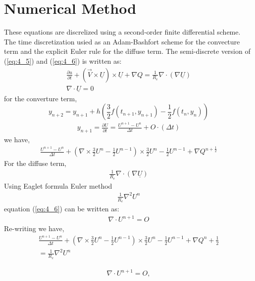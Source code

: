 \documentclass[11pt]{report}
\newcommand{\sps}{\\[0.2cm]}
\newcommand{\refn}[1]{(\ref{#1})}
\newcommand{\refx}[1]{\refn{eq:#1}}
\begin{document}
	\section{Numerical Method}
	These equations are discrelized using a second-order finite differential scheme. The time discretization usied as an Adam-Bashfort scheme for the convecture term and the explicit Euler rule for the diffuse term. The semi-discrete version of \refx{4_5} and \refx{4_6} is written as:
	\begin{gather*}
		\frac{\partial u}{\partial t} + (\vec{V}\times\underline{U}) \times \underline{U} + \nabla Q = \frac{1}{R_e}\nabla \cdot (\nabla \underline{U})\sps
		\nabla \cdot \underline{U} = 0
	\end{gather*}
	for the converture term, 
	\begin{equation*}
		y_{n+2} = y_{n+1} + h\left(\frac{3}{2}f(t_{n+1}, y_{n+1})-\frac{1}{2}f(t_n,y_n)\right)
	\end{equation*}
	\begin{eqnarray}
		y_{n+1} = \frac{\partial U}{\partial t} = \frac{U^{n+1}-U^n}{\Delta t} + O\cdot(\Delta t)
	\end{eqnarray}
	we have,
	\begin{eqnarray}
		\frac{U^{n+1}-U^n}{\Delta t} + \left(\nabla \times\frac{3}{2}U^n-\frac{1}{2}U^{n-1}\right)\times\frac{3}{2}U^{n} - \frac{1}{2}U^{n-1} + \nabla Q^{n+\frac{1}{2}}
	\end{eqnarray}
	For the diffuse term,
	\begin{eqnarray*}
		\frac{1}{R_e}\nabla \cdot (\nabla \underline{U})
	\end{eqnarray*}
	Using Eaglet formula Euler method
	\begin{eqnarray}
		\frac{1}{R_e}\nabla^2 U^n
	\end{eqnarray}
	equation \refx{4_6} can be written as:
	\begin{eqnarray}
		\nabla \cdot U^{n+1}=O
	\end{eqnarray}
	Re-writing we have,
	\begin{multline}
		\frac{U^{n+1} - U^n}{\Delta t} +\left(\nabla \times \frac{3}{2}U^n -\frac{1}{2}U^{n-1}\right)\times\frac{3}{2}U^{n} - \frac{1}{2}U^{n-1} + \nabla Q^n + \frac{1}{2} \\= \frac{1}{R_e}\nabla^2 U^{n}
 	\end{multline}
	
	\begin{eqnarray*}
		\nabla \cdot U^{n+1}=O,
	\end{eqnarray*}
	
\end{document}
